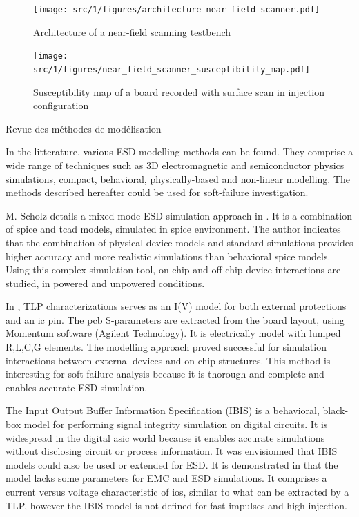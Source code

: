 \begin{figure}[!h]
  \centering
  \texttt{[image: src/1/figures/architecture\_near\_field\_scanner.pdf]}
  \caption{Architecture of a near-field scanning testbench}
  \label{fig:near-field-scanner}
\end{figure}

\begin{figure}[!h]
  \centering
  \texttt{[image: src/1/figures/near\_field\_scanner\_susceptibility\_map.pdf]}
  \caption{Susceptibility map of a board recorded with surface scan in injection configuration \cite{}}
  \label{fig:near-field-scan-map}
\end{figure}

Revue des méthodes de modélisation

In the litterature, various ESD modelling methods can be found.
They comprise a wide range of techniques such as 3D electromagnetic and semiconductor physics simulations, compact, behavioral, physically-based and non-linear modelling.
The methods described hereafter could be used for soft-failure investigation.

M. Scholz details a mixed-mode ESD simulation approach in \cite{mixedModeESDSims}.
It is a combination of \gls{spice} and \gls{tcad} models, simulated in \gls{spice} environment.
The author indicates that the combination of physical device models and standard simulations provides higher accuracy and more realistic simulations than behavioral \gls{spice} models.
Using this complex simulation tool, on-chip and off-chip device interactions are studied, in powered and unpowered conditions.

In \cite{usb2ESDProtection}, TLP characterizations serves as an I(V) model for both external protections and an \gls{ic} pin.
The \gls{pcb} S-parameters are extracted from the board layout, using Momentum software (Agilent Technology).
It is electrically model with lumped R,L,C,G elements.
The modelling approach proved successful for simulation interactions between external devices and on-chip structures.
This method is interesting for soft-failure analysis because it is thorough and complete and enables accurate ESD simulation.

The Input Output Buffer Information Specification (IBIS) \cite{ibis-spec} is a behavioral, black-box model for performing signal integrity simulation on digital circuits.
It is widespread in the digital \gls{asic} world because it enables accurate simulations without disclosing circuit or process information.
It was envisionned that IBIS models could also be used or extended for ESD.
It is demonstrated in \cite{ibisImprovementFabrice} that the model lacks some parameters for EMC and ESD simulations.
It comprises a current versus voltage characteristic of \gls{io}s, similar to what can be extracted by a TLP, however the IBIS model is not defined for fast impulses and high injection.

